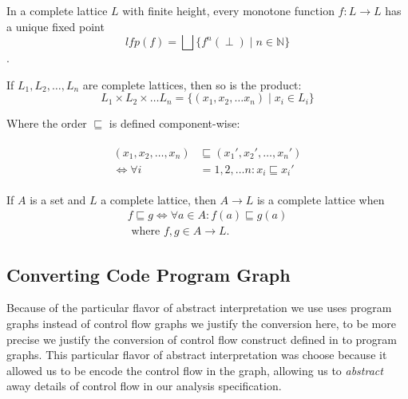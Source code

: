 \begin{theorem}\label{thm:kleene_finite}
    In a complete lattice $L$ with finite height, every monotone function $f : L \rightarrow L$ has a unique fixed point
    \begin{equation}
        lfp(f) = \bigsqcup\{f^n(\perp) \mid n \in \mathbb{N}\}
    \end{equation}.
\end{theorem}


\begin{theorem}
    If $L_1, L_2, \dots, L_n$ are complete lattices, then so is the product:
    \begin{equation}
        L_1 \times L_2 \times \dots L_n = \{(x_1, x_2, \dots x_n) \mid x_i \in L_i\}
    \end{equation}

    Where the order $\sqsubseteq$ is defined component-wise:

    \begin{align}
        \begin{split}
        (x_1, x_2, \dots, x_n) &\sqsubseteq (x_1', x_2', \dots, x_n') \\
        \iff
        \forall i &= 1, 2, \dots n : x_i \sqsubseteq x_i'
        \end{split}
    \end{align}
\end{theorem}

\begin{theorem}
    If $A$ is a set and $L$ a complete lattice, then $A \rightarrow L$ is a complete lattice when
    \begin{equation}
    \begin{split}
        f \sqsubseteq g \iff \forall a \in A : f(a) \sqsubseteq g(a) \\ \text{ where } f,g \in A \rightarrow L.\label{eq:equation-complete-lattice-theorem}
    \end{split}
    \end{equation}
\end{theorem}

\subsection{Converting Code Program Graph}\label{subsec:converting-code-program-graph}

Because of the particular flavor of abstract interpretation we use uses program graphs instead of control flow graphs we justify the conversion here, to be more precise we justify the conversion of control flow construct defined in \cite{halder_abstract_2012} to program graphs.
This particular flavor of abstract interpretation was choose because it allowed us to be encode the control flow in the graph, allowing us to \emph{abstract} away details of control flow in our analysis specification.

